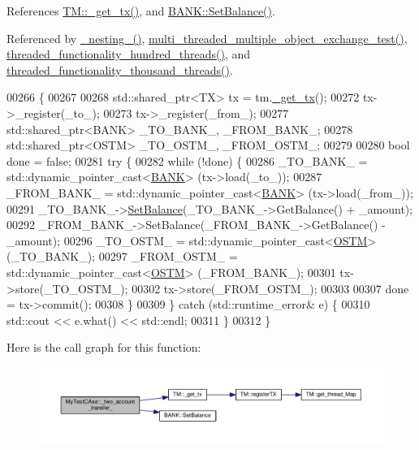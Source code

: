 References \hyperlink{_t_m_8cpp_source_l00079}{T\+M\+::\+\_\+get\+\_\+tx()}, and \hyperlink{_b_a_n_k_8h_source_l00046}{B\+A\+N\+K\+::\+Set\+Balance()}.



Referenced by \hyperlink{_my_test_c_ase_8cpp_source_l00320}{\+\_\+nesting\+\_\+()}, \hyperlink{_my_test_c_ase_8cpp_source_l00922}{multi\+\_\+threaded\+\_\+multiple\+\_\+object\+\_\+exchange\+\_\+test()}, \hyperlink{_my_test_c_ase_8cpp_source_l00523}{threaded\+\_\+functionality\+\_\+hundred\+\_\+threads()}, and \hyperlink{_my_test_c_ase_8cpp_source_l00556}{threaded\+\_\+functionality\+\_\+thousand\+\_\+threads()}.


\begin{DoxyCode}
00266                                                                                                            
                \{
00267 
00268     std::shared\_ptr<TX> tx = tm.\hyperlink{class_t_m_a41cb0226cc4080c931651b13f74a0075_a41cb0226cc4080c931651b13f74a0075}{\_get\_tx}();
00272     tx->\_register(\_to\_);
00273     tx->\_register(\_from\_);
00277     std::shared\_ptr<BANK> \_TO\_BANK\_, \_FROM\_BANK\_;
00278     std::shared\_ptr<OSTM> \_TO\_OSTM\_, \_FROM\_OSTM\_;
00279 
00280     \textcolor{keywordtype}{bool} done = \textcolor{keyword}{false};
00281     \textcolor{keywordflow}{try} \{
00282         \textcolor{keywordflow}{while} (!done) \{
00286             \_TO\_BANK\_ = std::dynamic\_pointer\_cast<\hyperlink{class_b_a_n_k}{BANK}> (tx->load(\_to\_));
00287             \_FROM\_BANK\_ = std::dynamic\_pointer\_cast<\hyperlink{class_b_a_n_k}{BANK}> (tx->load(\_from\_));
00291             \_TO\_BANK\_->\hyperlink{class_b_a_n_k_ae3e45b407bf8ec7175662442ea24b7c0_ae3e45b407bf8ec7175662442ea24b7c0}{SetBalance}(\_TO\_BANK\_->GetBalance() + \_amount);
00292             \_FROM\_BANK\_->SetBalance(\_FROM\_BANK\_->GetBalance() - \_amount);
00296             \_TO\_OSTM\_ = std::dynamic\_pointer\_cast<\hyperlink{class_o_s_t_m}{OSTM}> (\_TO\_BANK\_);
00297             \_FROM\_OSTM\_ = std::dynamic\_pointer\_cast<\hyperlink{class_o_s_t_m}{OSTM}> (\_FROM\_BANK\_);
00301             tx->store(\_TO\_OSTM\_);
00302             tx->store(\_FROM\_OSTM\_);
00303 
00307             done = tx->commit();
00308         \}
00309     \} \textcolor{keywordflow}{catch} (std::runtime\_error& e) \{
00310         std::cout << e.what() << std::endl;
00311     \}
00312 \}
\end{DoxyCode}


Here is the call graph for this function\+:
\nopagebreak
\begin{figure}[H]
\begin{center}
\leavevmode
\includegraphics[width=350pt]{class_my_test_c_ase_af0cc86421d281cc4a583a394ae86dbdd_af0cc86421d281cc4a583a394ae86dbdd_cgraph}
\end{center}
\end{figure}


